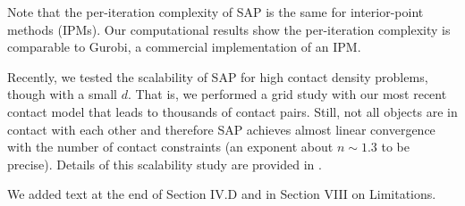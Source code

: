 Note that the  per-iteration complexity of SAP is the same
for interior-point methods (IPMs).  Our computational results show the per-iteration
complexity is comparable to Gurobi, a commercial implementation of an IPM.

Recently, we tested the scalability of SAP for high contact density problems,
though with a small $d$. That is, we performed a grid study with our most recent
contact model that leads to thousands of contact pairs. Still, not all objects
are in contact with each other and therefore SAP achieves almost linear
convergence with the number of contact constraints (an exponent about $n\sim1.3$
to be precise). Details of this scalability study are provided in
\cite{bib:masterjohn2021discrete}.

We added text at the end of Section IV.D and in Section VIII on Limitations.

